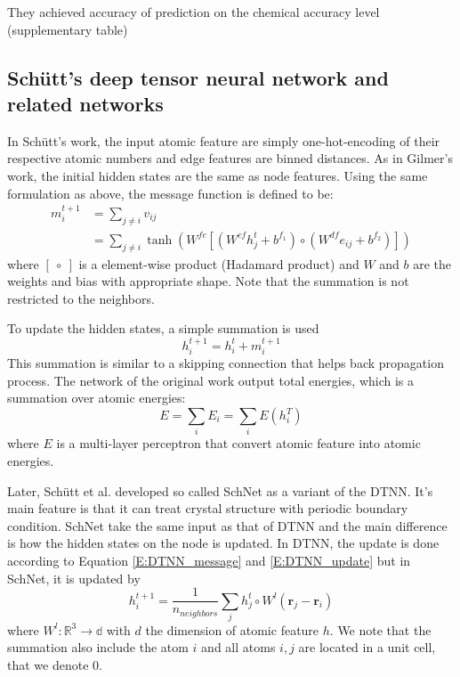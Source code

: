 \documentclass{article}
\begin{document}
They achieved accuracy of prediction on the chemical accuracy level (supplementary table)

\subsection{Sch\"{u}tt's deep tensor neural network and related networks}
In Sch\"{u}tt's work\cite{DTNN}, the input atomic feature are simply one-hot-encoding of their
respective atomic numbers and edge features are binned distances. 
As in Gilmer's work, the initial hidden states are the same as node features.
Using the same formulation as above, the message function is defined to be:
\begin{align}
    \label{E:DTNN_message}
    m_i^{t+1} &= \sum_{j\neq i} v_{ij} \\
            &= \sum_{j\neq i} \tanh \left( W^{fc}[ (W^{cf} h_j^t + b^{f_1}) \circ (W^{df} e_{ij} + b^{f_2}) ] \right)
\end{align}
where $[\ \circ\ ]$ is a element-wise product (Hadamard product) and $W$ and $b$ are the weights and bias with appropriate shape. 
Note that the summation is not restricted to the neighbors. 

To update the hidden states, a simple summation is used 
\begin{equation}
    \label{E:DTNN_update}
    h_i^{t+1} = h_i^t + m_i^{t+1}
\end{equation} 
This summation is similar to a skipping connection that helps back propagation process. 
The network of the original work output total energies, which is a summation over atomic energies:
\begin{equation}
    E = \sum_i E_i = \sum_i E(h_i^T)
\end{equation}
where $E$ is a multi-layer perceptron that convert atomic feature into atomic energies.

Later, Sch\"{u}tt et al.\cite{SchNet} developed so called SchNet as a variant of the DTNN. 
It's main feature is that it can treat crystal structure with periodic boundary condition.
SchNet take the same input as that of DTNN and the main difference is how the hidden states 
on the node is updated. In DTNN, the update is done according to Equation \eqref{E:DTNN_message}
and \eqref{E:DTNN_update} but in SchNet, it is updated by 
\begin{equation}
    \label{E:schnet_filter}
    h_i^{t+1} = \frac{1}{n_{neighbors}} \sum_j h^t_j \circ W^l(\mathbf{r}_j - \mathbf{r}_i)
\end{equation}
where $W^l\colon \mathbb{R}^3\to \mathbb{d}$ with $d$ the dimension of atomic feature $h$. We 
note that the summation also include the atom $i$ and all atoms $i,j$ are located in a 
unit cell, that we denote 0.
\end{document}
